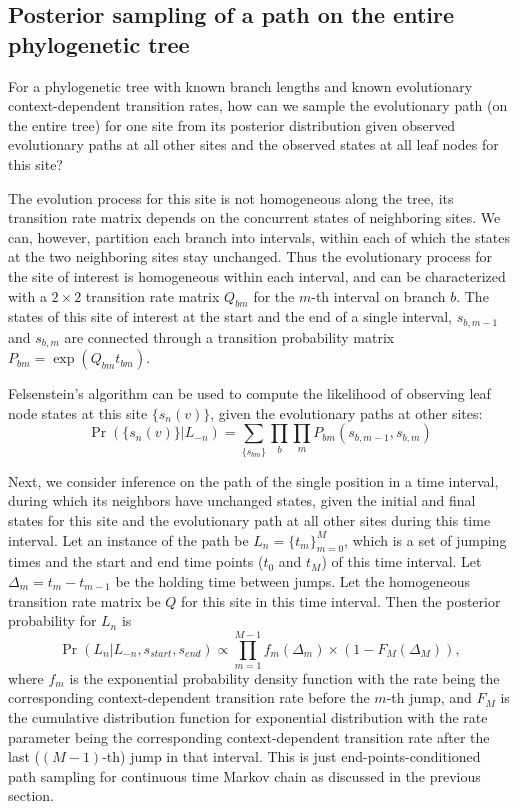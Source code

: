 \documentclass[11pt]{article}
\begin{document}
\subsection{Posterior sampling of a path on the entire phylogenetic tree}
For a phylogenetic tree with known branch lengths and known
evolutionary context-dependent transition rates, how can we sample the
evolutionary path (on the entire tree) for one site from its posterior
distribution given observed evolutionary paths at all other sites and the
observed states at all leaf nodes for this site?

The evolution process for this site is not homogeneous along the tree,
its transition rate matrix depends on the concurrent states of
neighboring sites. We can, however, partition each branch into
intervals, within each of which the states at the two neighboring
sites stay unchanged. Thus the evolutionary process for the site of
interest is homogeneous within each interval, and can be characterized
with a $2\times2$ transition rate matrix $Q_{bm}$ for the $m$-th
interval on branch $b$. The states of this site of interest at the
start and the end of a single interval, $s_{b,m-1}$ and $s_{b,m}$ are
connected through a transition probability matrix $P_{bm} =
\exp(Q_{bm}t_{bm})$.

Felsenstein's algorithm can be used to compute the likelihood of
observing leaf node states at this site $\{s_n(v)\}$, given the
evolutionary paths at other sites:
\[
\Pr(\{s_n(v)\} | L_{-n}) = \sum\limits_{\{s_{bm}\}} \prod\limits_{b} \prod\limits_{m} P_{bm}(s_{b,m-1}, s_{b, m})
\]

Next, we consider inference on the path of the single position in
a time interval, during which its neighbors have unchanged states,
given the initial and final states for this site and the evolutionary
path at all other sites during this time interval. Let an instance of
the path be $L_n = \{t_m\}_{m=0}^{M}$, which is a set of jumping times
and the start and end time points ($t_0$ and $t_M$) of this time
interval. Let $\Delta_m = t_m - t_{m-1}$ be the holding time between
jumps. Let the homogeneous transition rate matrix be $Q$ for this site
in this time interval. Then the posterior probability for $L_n$ is
\[
\Pr(L_n|L_{-n}, s_{start}, s_{end}) \propto \prod\limits_{m=1}^{M-1} f_m(\Delta_m) \times (1-F_M(\Delta_M)),
\]
where $f_m$ is the exponential probability density function with the
rate being the corresponding context-dependent transition rate before
the $m$-th jump, and $F_M$ is the cumulative distribution function for
exponential distribution with the rate parameter being the
corresponding context-dependent transition rate after the last
($(M-1)$-th) jump in that interval. This is just
end-points-conditioned path sampling for continuous time Markov chain
as discussed in the previous section.
\end{document}

